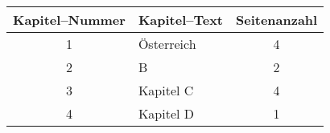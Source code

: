 \documentclass{article}
\begin{document}
\begin{tabular}{@{}clc@{}}\toprule
Kapitel--Nummer & Kapitel--Text & Seitenanzahl \\\midrule
1 & ^^d6sterreich & 4 \\
2 & B & 2 \\
3 & Kapitel C & 4 \\
4 & Kapitel D & 1 \\
\bottomrule
\end{tabular}
\end{document}
